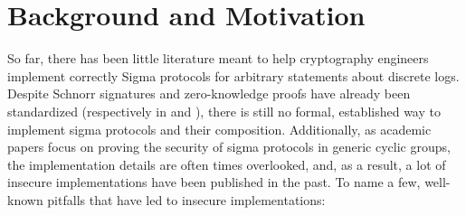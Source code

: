 \documentclass[runningheads]{llncs}
\begin{document}
\section{Background and Motivation}
\label{sec:motivation}
So far, there has been little literature meant to help cryptography engineers implement correctly Sigma protocols for arbitrary statements about discrete logs.
Despite Schnorr signatures and zero-knowledge proofs have already been standardized (respectively in \cite{rfc8032} and \cite{rfc8235}), there is still no formal, established way to implement sigma protocols and their composition.
 Additionally, as academic papers focus on proving the security of sigma protocols in generic cyclic groups, the implementation details are often times overlooked, and, as a result, a lot of insecure implementations have been published in the past. To name a few, well-known pitfalls that have led to insecure implementations:
\end{document}
